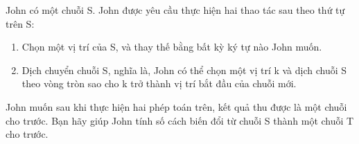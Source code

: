 John có một chuỗi S. John được yêu cầu thực hiện hai thao tác sau       theo thứ tự      trên S:  
\begin{enumerate}
	\item     Chọn một vị trí của S, và thay thế bằng bất kỳ ký tự nào John muốn.   
	\item     Dịch chuyển chuỗi S, nghĩa là, John có thể chọn một vị trí k và dịch chuỗi S theo vòng tròn sao cho k trở thành vị trí bắt đầu của chuỗi mới.   
\end{enumerate}

   John muốn sau khi thực hiện hai phép toán trên, kết quả thu được là một chuỗi cho trước.  Bạn hãy giúp John tính số cách biến đổi từ chuỗi S thành một chuỗi T cho trước.  

\